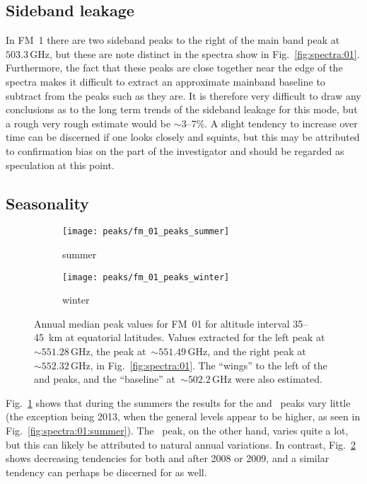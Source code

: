 \subsection{Sideband leakage}
\label{FM01:sbl}
In FM~1 there are two sideband peaks to the right of the main band peak at
$503.3\,\mathrm{GHz}$, but these are note distinct in the spectra show in
Fig.~\ref{fig:spectra:01}.  Furthermore, the fact that these peaks are close
together near the edge of the spectra makes it difficult to extract an
approximate mainband baseline to subtract from the peaks such as they are.  It
is therefore very difficult to draw any conclusions as to the long term trends
of the sideband leakage for this mode, but a rough very rough estimate would be
$\sim3$--$7$\%.  A slight tendency to increase over time can be discerned if
one looks closely and squints, but this may be attributed to confirmation bias
on the part of the investigator and should be regarded as speculation at this
point.


\subsection{Seasonality}
\label{FM01:seasonality}

\begin{figure}[ht]
    \centering
    \begin{subfigure}[b]{0.9545\textwidth}
        \texttt{[image: peaks/fm\_01\_peaks\_summer]}
        \caption{summer}\label{fig:peaks:01:summer}
    \end{subfigure}
    \begin{subfigure}[b]{0.9545\textwidth}
        \texttt{[image: peaks/fm\_01\_peaks\_winter]}
        \caption{winter}\label{fig:peaks:01:winter}
    \end{subfigure}
    \caption{Annual median peak values for FM~01 for altitude interval
        35--45~km at equatorial latitudes.  Values extracted for the left
         peak at~$\sim551.28\,\mathrm{GHz}$, the  peak
        at~$\sim551.49\,\mathrm{GHz}$, and the right  peak
        at~$\sim552.32\,\mathrm{GHz}$, in Fig.~\ref{fig:spectra:01}.  The
        ``wings'' to the left of the  and  peaks, and the
        ``baseline'' at~$\sim502.2\,\mathrm{GHz}$ were also estimated.
        }\label{fig:peaks:01}
\end{figure}

\noindent
Fig.~\ref{fig:peaks:01:summer} shows that during the summers the results for
the  and ~peaks vary little (the exception being 2013,
when the general levels appear to be higher, as seen in
Fig.~\ref{fig:spectra:01:summer}).  The ~peak, on the other hand,
varies quite a lot, but this can likely be attributed to natural annual
variations.  In contrast, Fig.~\ref{fig:peaks:01:winter} shows decreasing
tendencies for both  and  after 2008 or 2009, and a
similar tendency can perhaps be discerned for  as well.

